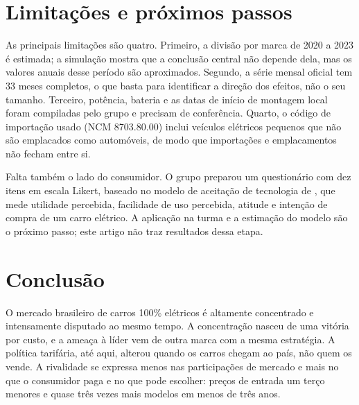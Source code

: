 \documentclass[article,11pt,oneside,a4paper,english,brazil,sumario=tradicional]{abntex2}
\begin{document}
\section{Limitações e próximos passos}\label{sec:limites}

As principais limitações são quatro. Primeiro, a divisão por marca de 2020 a 2023 é estimada; a simulação mostra que a conclusão central não depende dela, mas os valores anuais desse período são aproximados. Segundo, a série mensal oficial tem 33 meses completos, o que basta para identificar a direção dos efeitos, não o seu tamanho. Terceiro, potência, bateria e as datas de início de montagem local foram compiladas pelo grupo e precisam de conferência. Quarto, o código de importação usado (NCM 8703.80.00) inclui veículos elétricos pequenos que não são emplacados como automóveis, de modo que importações e emplacamentos não fecham entre si.

Falta também o lado do consumidor. O grupo preparou um questionário com dez itens em escala Likert, baseado no modelo de aceitação de tecnologia de , que mede utilidade percebida, facilidade de uso percebida, atitude e intenção de compra de um carro elétrico. A aplicação na turma e a estimação do modelo são o próximo passo; este artigo não traz resultados dessa etapa.

\section{Conclusão}

O mercado brasileiro de carros 100\% elétricos é altamente concentrado e intensamente disputado ao mesmo tempo. A concentração nasceu de uma vitória por custo, e a ameaça à líder vem de outra marca com a mesma estratégia. A política tarifária, até aqui, alterou quando os carros chegam ao país, não quem os vende. A rivalidade se expressa menos nas participações de mercado e mais no que o consumidor paga e no que pode escolher: preços de entrada um terço menores e quase três vezes mais modelos em menos de três anos.

\postextual

\end{document}

